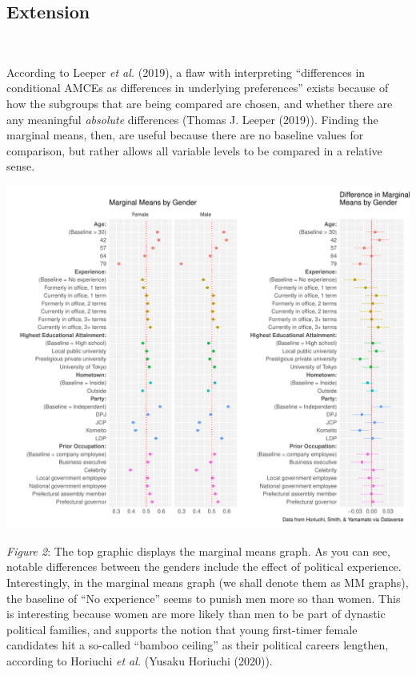 \documentclass[
]{article}
\begin{document}
\hypertarget{extension}{%
\subsection{Extension}\label{extension}}

~

According to Leeper \emph{et al.} (2019), a flaw with interpreting ``differences in conditional AMCEs as differences in underlying preferences'' exists because of how the subgroups that are being compared are chosen, and whether there are any meaningful \emph{absolute} differences (Thomas J. Leeper (2019)). Finding the marginal means, then, are useful because there are no baseline values for comparison, but rather allows all variable levels to be compared in a relative sense.

\includegraphics{milestone_8_files/figure-latex/display_2-1.pdf}

\emph{Figure 2}: The top graphic displays the marginal means graph. As you can see, notable differences between the genders include the effect of political experience. Interestingly, in the marginal means graph (we shall denote them as MM graphs), the baseline of ``No experience'' seems to punish men more so than women. This is interesting because women are more likely than men to be part of dynastic political families, and supports the notion that young first-timer female candidates hit a so-called ``bamboo ceiling'' as their political careers lengthen, according to Horiuchi \emph{et al.} (Yusaku Horiuchi (2020)).
\end{document}
